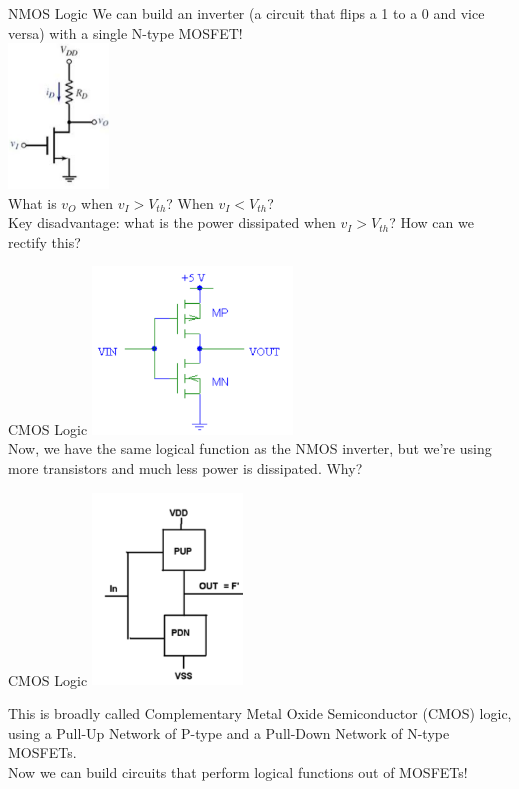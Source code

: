 \documentclass{beamer}
\begin{document}
	\begin{frame}{NMOS Logic}
	    We can build an inverter (a circuit that flips a 1 to a 0 and vice versa) with a single N-type MOSFET! \\
	    \includegraphics[width=0.2\textwidth]{nmos-inverter.png}
	    \\
	    What is $v_O$ when $v_I>V_{th}$? When $v_I<V_{th}$?
	    \\
	    Key disadvantage: what is the power dissipated when $v_I>V_{th}$? How can we rectify this?
	\end{frame}
	
	\begin{frame}{CMOS Logic}
	    \includegraphics[width=0.4\textwidth]{cmos-inverter.png}
	    \\
	    Now, we have the same logical function as the NMOS inverter, but we're using more transistors and much less power is dissipated. Why?
	\end{frame}
	
	\begin{frame}{CMOS Logic}
	    \includegraphics[width=0.3\textwidth]{cmos.png}
	    
	    This is broadly called Complementary Metal Oxide Semiconductor (CMOS) logic, using a Pull-Up Network of P-type and a Pull-Down Network of N-type MOSFETs.
	    \\
	    Now we can build circuits that perform logical functions out of MOSFETs!
	\end{frame}
	
\end{document}
